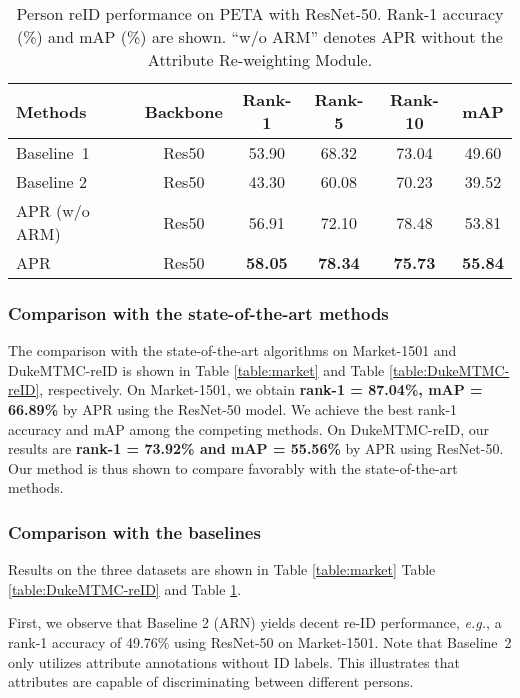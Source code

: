 \documentclass[5p,times,twocolumn]{elsarticle}
\begin{document}
    \setlength{\tabcolsep}{5pt}
    \begin{table}[!t]
        \small
      \footnotesize
        \renewcommand{\arraystretch}{1.0}
            \caption{Person reID performance on PETA with ResNet-50. Rank-1 accuracy (\%) and mAP (\%) are shown. ``w/o ARM'' denotes APR without the Attribute Re-weighting Module.}
        \begin{center}
            \begin{tabular}{l|c|cccc}
            \hline
            Methods&Backbone&Rank-1 & Rank-5 &Rank-10& mAP\\
            \hline
            Baseline~1   &Res50& 53.90 & 68.32 & 73.04 &  49.60\\ 
            Baseline 2   &Res50& 43.30 & 60.08 & 70.23 & 39.52\\ 
            \hline
            APR (w/o ARM)   &Res50& 56.91& 72.10 &78.48 &  53.81 \\
            APR   &Res50& \textbf{58.05} & \textbf{78.34} & \textbf{75.73} &  \textbf{55.84} \\
            \hline
            \end{tabular}
            \label{table:peta1}
        \end{center}
    \end{table}
\subsubsection{Comparison with the state-of-the-art methods} The comparison with the state-of-the-art algorithms on Market-1501 and DukeMTMC-reID is shown in Table \ref{table:market} and Table \ref{table:DukeMTMC-reID}, respectively. On Market-1501, we obtain \textbf{rank-1 = 87.04\%, mAP = 66.89\%} by APR using the ResNet-50 model. We achieve the best rank-1 accuracy and mAP among the competing methods.  On DukeMTMC-reID, our results are \textbf{rank-1 = 73.92\% and mAP = 55.56\%} by APR using ResNet-50. Our method is thus shown to compare favorably with the state-of-the-art methods. 

\subsubsection{Comparison with the baselines}
Results on the three datasets are shown in Table \ref{table:market} Table \ref{table:DukeMTMC-reID} and Table \ref{table:peta1}. 
    
First, we observe that Baseline 2 (ARN) yields decent re-ID performance, \emph{e.g.}, a rank-1 accuracy of 49.76\% using ResNet-50 on Market-1501. 
Note that Baseline~2 only utilizes attribute annotations without ID labels. This illustrates that attributes are capable of discriminating between different persons. 
\end{document}
